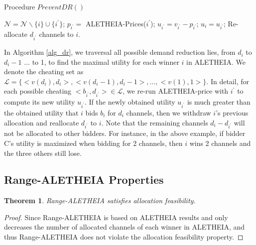 \documentclass{sig-alternate}
\newtheorem{theorem}{Theorem}
\begin{document}
{\renewcommand\baselinestretch{1}\selectfont
\begin{algorithm}[h]
    \caption{Procedure $PreventDR()$}
    \label{alg_dr}
    \begin{algorithmic}[1]
                    \STATE $\mathcal{N} = \mathcal{N} \backslash \{i\} \cup \{i^{'}\}$;
                    \STATE $p_{i^{'}} = $ ALETHEIA-Prices($i^{'}$);
                    \STATE $u_{i^{'}} = v_{i^{'}} - p_{i^{'}}$;
                        \STATE $u_i = u_{i^{'}}$;
                        \STATE Re-allocate $d_{i^{'}}$ channels to $i$.
                    \ENDIF
                \ENDFOR
            \ENDIF
        \ENDFOR

    \end{algorithmic}
\end{algorithm}
\par}


In Algorithm \ref{alg_dr}, we traversal all possible demand reduction lies, from $d_i$ to $d_i-1$ $\ldots$ to 1, to find the maximal utility for each winner $i$ in ALETHEIA. We denote the cheating set as $\mathcal{L}=\{<v(d_i),d_i>, <v(d_i-1),d_i-1>, \dots, <v(1),1> \}$. In detail, for each possible cheating $<b_{i^{'}},d_{i^{'}}> \in \mathcal{L}$, we re-run ALETHEIA-price with $i^{'}$ to compute its new utility $u_{i^{'}}$. If the newly obtained utility $u_{i^{'}}$ is much greater than the obtained utility that $i$ bids $b_i$ for $d_i$ channels, then we withdraw $i$'s previous allocation and reallocate $d_{i^{'}}$ to $i$. Note that the remaining channels $d_i - d_{i^{'}}$ will not be allocated to other bidders. For instance, in the above example, if bidder C's utility is maximized when bidding for 2 channels, then $i$ wins 2 channels and the three others still lose.

\subsection{Range-ALETHEIA Properties}

\begin{theorem}
\label{th_rfea}
   Range-ALETHEIA satisfies allocation feasibility.
\end{theorem}
\begin{proof}
Since Range-ALETHEIA is based on ALETHEIA results and only decreases the number of  allocated channels of each winner in ALETHEIA, and thus Range-ALETHEIA does not violate the allocation feasibility property.
\end{proof}
\end{document}
